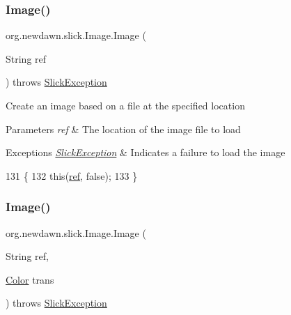 \subsubsection{\texorpdfstring{Image()}{Image()}\hspace{0.1cm}{\footnotesize\ttfamily [4/16]}}
{\footnotesize\ttfamily org.\+newdawn.\+slick.\+Image.\+Image (\begin{DoxyParamCaption}\item[{String}]{ref }\end{DoxyParamCaption}) throws \mbox{\hyperlink{classorg_1_1newdawn_1_1slick_1_1_slick_exception}{Slick\+Exception}}\hspace{0.3cm}{\ttfamily [inline]}}

Create an image based on a file at the specified location


\begin{DoxyParams}{Parameters}
{\em ref} & The location of the image file to load \\
\hline
\end{DoxyParams}

\begin{DoxyExceptions}{Exceptions}
{\em \mbox{\hyperlink{classorg_1_1newdawn_1_1slick_1_1_slick_exception}{Slick\+Exception}}} & Indicates a failure to load the image \\
\hline
\end{DoxyExceptions}

\begin{DoxyCode}
131                                                     \{
132         \textcolor{keyword}{this}(\mbox{\hyperlink{classorg_1_1newdawn_1_1slick_1_1_image_a32694687591a80299d8b8ad1ea070cee}{ref}}, \textcolor{keyword}{false});
133     \}
\end{DoxyCode}
\mbox{\label{classorg_1_1newdawn_1_1slick_1_1_image_a992a065fb27803ab47e948ab9a97f74c}} 
\subsubsection{\texorpdfstring{Image()}{Image()}\hspace{0.1cm}{\footnotesize\ttfamily [5/16]}}
{\footnotesize\ttfamily org.\+newdawn.\+slick.\+Image.\+Image (\begin{DoxyParamCaption}\item[{String}]{ref,  }\item[{\mbox{\hyperlink{classorg_1_1newdawn_1_1slick_1_1_color}{Color}}}]{trans }\end{DoxyParamCaption}) throws \mbox{\hyperlink{classorg_1_1newdawn_1_1slick_1_1_slick_exception}{Slick\+Exception}}\hspace{0.3cm}{\ttfamily [inline]}}


